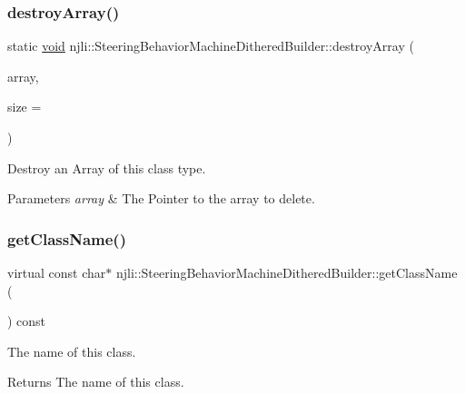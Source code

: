 \subsubsection{\texorpdfstring{destroy\+Array()}{destroyArray()}}
{\footnotesize\ttfamily static \mbox{\hyperlink{_thread_8h_af1e856da2e658414cb2456cb6f7ebc66}{void}} njli\+::\+Steering\+Behavior\+Machine\+Dithered\+Builder\+::destroy\+Array (\begin{DoxyParamCaption}\item[{\mbox{\hyperlink{classnjli_1_1_steering_behavior_machine_dithered_builder}{Steering\+Behavior\+Machine\+Dithered\+Builder}} $\ast$$\ast$}]{array,  }\item[{const \mbox{\hyperlink{_util_8h_a10e94b422ef0c20dcdec20d31a1f5049}{u32}}}]{size = {} }\end{DoxyParamCaption})\hspace{0.3cm}{\ttfamily [static]}}

Destroy an Array of this class type.


\begin{DoxyParams}{Parameters}
{\em array} & The Pointer to the array to delete. \\
\hline
\end{DoxyParams}
\mbox{\label{classnjli_1_1_steering_behavior_machine_dithered_builder_a55ddd9357c21d013c041001b298f999e}} 
\subsubsection{\texorpdfstring{get\+Class\+Name()}{getClassName()}}
{\footnotesize\ttfamily virtual const char$\ast$ njli\+::\+Steering\+Behavior\+Machine\+Dithered\+Builder\+::get\+Class\+Name (\begin{DoxyParamCaption}{ }\end{DoxyParamCaption}) const\hspace{0.3cm}{\ttfamily [virtual]}}

The name of this class.

\begin{DoxyReturn}{Returns}
The name of this class. 
\end{DoxyReturn}


